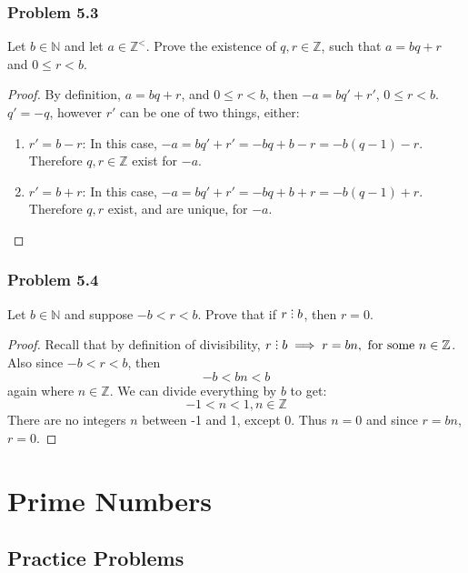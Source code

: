 \documentclass[hidelinks,12pt]{article}
\newcommand{\N}{\mathbb{N}}
\newcommand{\Z}{\mathbb{Z}}
\newcommand{\divby}{%
  \mathrel{\text{\vbox{\baselineskip.65ex\lineskiplimit0pt\hbox{.}\hbox{.}\hbox{.}}}}%
  }
\begin{document}
\subsubsection{Problem 5.3}
Let $b\in\N$ and let $a\in\Z^<$. Prove the existence of $q,r\in\Z$, such that $a=bq+r$ and $0\leq r<b$.
\begin{proof}
By definition, $a=bq+r$, and $0\leq r<b$, then $-a=bq'+r'$, $0\leq r<b$. $q'=-q$, however $r'$ can be one of two things, either:\begin{enumerate}
    \item $r'=b-r$: In this case, $-a=bq'+r'=-bq+b-r=-b(q-1)-r$. Therefore $q,r\in\Z$ exist for $-a$.
    \item $r'=b+r$: In this case, $-a=bq'+r'=-bq+b+r=-b(q-1)+r$. Therefore $q,r$ exist, and are unique, for $-a$.
\end{enumerate}
\end{proof}
\subsubsection{Problem 5.4}
Let $b\in\N$ and suppose $-b<r<b$. Prove that if $r\divby b$, then $r=0$.
\begin{proof}
Recall that by definition of divisibility, $r\divby b\implies r=bn,\text{ for some }n\in\Z$. Also since $-b<r<b$, then $$-b<bn<b$$ again where $n\in\Z$. We can divide everything by $b$ to get:$$-1<n<1, n\in\Z$$There are no integers $n$ between -1 and 1, except 0. Thus $n=0$ and since $r=bn$, $r=0$.
\end{proof}
\newpage
\section{Prime Numbers}
\subsection{Practice Problems}
\end{document}
